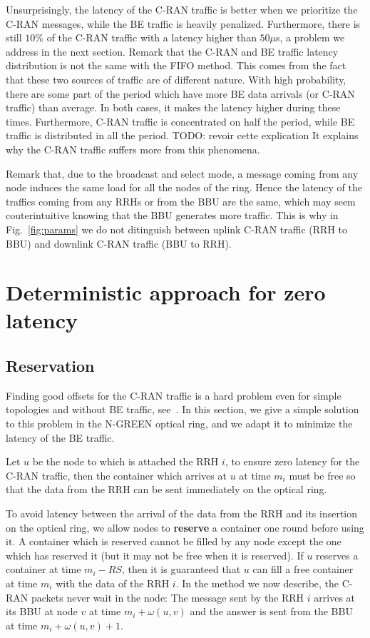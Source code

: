 \documentclass[10pt, conference, letterpaper]{IEEEtran}
\newcommand{\todo}[1]{{\color{red} TODO: {#1}}}
\begin{document}
Unsurprisingly, the latency of the C-RAN traffic is better when we prioritize the C-RAN messages, while the BE traffic is heavily penalized. Furthermore, there is still $10\%$ of the C-RAN traffic with a latency higher than $50 \mu$s, a problem we address in the next section. Remark that the C-RAN and BE traffic latency distribution is not the same with the FIFO method. This comes from the fact that these two sources of traffic are of different nature. With high probability, there are some part of the period which have more 
BE data arrivals (or C-RAN traffic) than average. In both cases, it makes the latency higher during these times. Furthermore, C-RAN traffic is concentrated on half the period, while BE traffic is distributed in all the period.\todo{revoir cette explication}
It explains why the C-RAN traffic suffers more from this phenomena.


Remark that, due to the broadcast and select mode, a message coming from any node induces the same load for all the nodes of the ring. Hence the latency of the traffics coming from any RRHs or from the BBU are the same, which may seem couterintuitive knowing that the BBU generates more traffic. This is why in Fig.~\ref{fig:params} we do not ditinguish between uplink C-RAN traffic (RRH to BBU) and downlink  C-RAN traffic (BBU to RRH).

\section{Deterministic approach for zero latency} \label{sec:deterministicalgorithms}
\subsection{Reservation}
Finding good offsets for the C-RAN traffic is a hard problem even for simple topologies and without BE traffic, see~\cite{dominique2018deterministic}. In this section, we give a simple solution to this problem in the N-GREEN optical ring, and we adapt it to minimize the latency of the BE traffic.

Let $u$ be the node to which is attached the RRH $i$, to ensure zero latency for the C-RAN traffic, then the container which arrives at $u$ at time $m_i$ must be free so that the data from the RRH can be sent immediately on the optical ring. 

To avoid latency between the arrival of the data from the RRH and its insertion on the optical ring, 
we allow nodes to \textbf{reserve} a container one round before using it. A container which is reserved cannot be filled by any node except the one which has reserved it (but it may not be free when it is reserved). 
If $u$ reserves a container at time $m_i - RS$, then it is guaranteed that $u$ can fill a free container at time $m_i$ with the data of the RRH $i$.
In the method we now describe, the C-RAN packets never wait in the node: The message sent by the RRH $i$ arrives at its BBU at node $v$ at time $m_i + \omega(u,v)$ and the answer is sent from the BBU at time $m_i + \omega(u,v) +1$.
\end{document}
